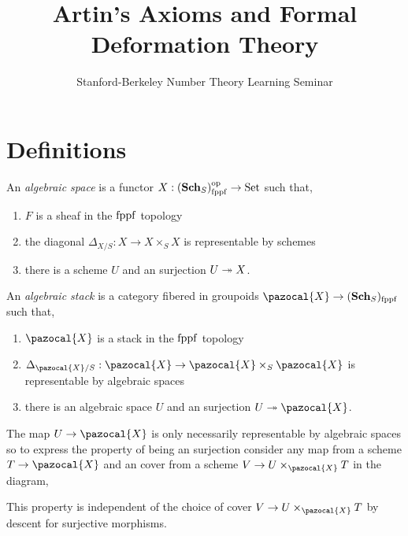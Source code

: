 \documentclass[12pt]{article}
\newcommand{\Set}{\mathrm{Set}}
\renewcommand{\X}{\pazocal{X}}
\begin{document}
\title{Artin's Axioms and Formal Deformation Theory}
\author{Stanford-Berkeley Number Theory Learning Seminar}
\maketitle

\section{Definitions}


\begin{defn}
An \textit{algebraic space} is a functor $X : (\Sch_S)_{\fppf}^{\op} \to \Set$ such that,
\begin{enumerate}
\item $F$ is a sheaf in the $\mathrm{fppf}$ topology
\item the diagonal $\Delta_{X/S} : X \to X \times_S X$ is representable by schemes
\item there is a scheme $U$ and an \etale surjection $U \twoheadrightarrow X$.
\end{enumerate}
\end{defn}

\begin{defn}
An \textit{algebraic stack} is a category fibered in groupoids $\X \to (\Sch_S)_{\fppf}$ such that,
\begin{enumerate}
\item $\X$ is a stack in the $\mathrm{fppf}$ topology
\item $\Delta_{\X / S} : \X \to \X \times_S \X$ is representable by algebraic spaces 
\item there is an algebraic space $U$ and an \etale surjection $U \onto \X$.
\end{enumerate}
\end{defn}

\begin{rmk}
The map $U \to \X$ is only necessarily representable by algebraic spaces so to express the property of being an \etale surjection consider any map from a scheme $T \to \X$ and an \etale cover from a scheme $V \to U \times_{\X} T$ in the diagram,
\begin{center}
\end{center}
This property is independent of the choice of \etale cover $V \to U \times_{\X} T$ by \etale descent for \etale surjective morphisms.
\end{rmk}
\end{document}
